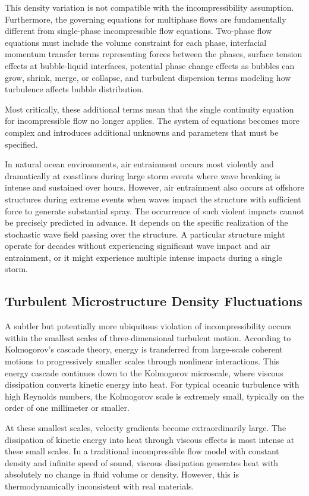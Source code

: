 ﻿\documentclass[a4paper,11pt]{article}
\theoremstyle{definition}
\begin{document}
This density variation is not compatible with the incompressibility assumption. Furthermore, the governing equations for multiphase flows are fundamentally different from single-phase incompressible flow equations. Two-phase flow equations must include the volume constraint for each phase, interfacial momentum transfer terms representing forces between the phases, surface tension effects at bubble-liquid interfaces, potential phase change effects as bubbles can grow, shrink, merge, or collapse, and turbulent dispersion terms modeling how turbulence affects bubble distribution.

Most critically, these additional terms mean that the single continuity equation for incompressible flow no longer applies. The system of equations becomes more complex and introduces additional unknowns and parameters that must be specified.

In natural ocean environments, air entrainment occurs most violently and dramatically at coastlines during large storm events where wave breaking is intense and sustained over hours. However, air entrainment also occurs at offshore structures during extreme events when waves impact the structure with sufficient force to generate substantial spray. The occurrence of such violent impacts cannot be precisely predicted in advance. It depends on the specific realization of the stochastic wave field passing over the structure. A particular structure might operate for decades without experiencing significant wave impact and air entrainment, or it might experience multiple intense impacts during a single storm.

\subsection{Turbulent Microstructure Density Fluctuations}

A subtler but potentially more ubiquitous violation of incompressibility occurs within the smallest scales of three-dimensional turbulent motion. According to Kolmogorov's cascade theory, energy is transferred from large-scale coherent motions to progressively smaller scales through nonlinear interactions. This energy cascade continues down to the Kolmogorov microscale, where viscous dissipation converts kinetic energy into heat. For typical oceanic turbulence with high Reynolds numbers, the Kolmogorov scale is extremely small, typically on the order of one millimeter or smaller.

At these smallest scales, velocity gradients become extraordinarily large. The dissipation of kinetic energy into heat through viscous effects is most intense at these small scales. In a traditional incompressible flow model with constant density and infinite speed of sound, viscous dissipation generates heat with absolutely no change in fluid volume or density. However, this is thermodynamically inconsistent with real materials.
\end{document}

